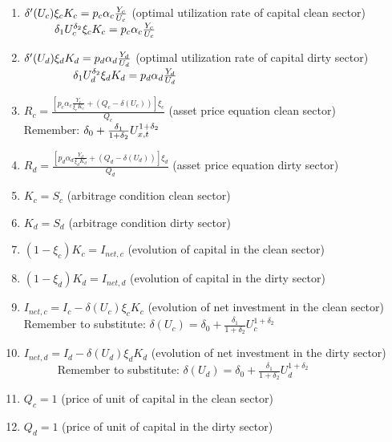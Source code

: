 \documentclass{article}
\begin{document}
\begin{enumerate}
\item $\delta ^{\prime }(U_{c})\xi _{c}K_{c}=p_{c}\alpha _{c}\frac{Y_{c}}{%
U_{c}}$ (optimal utilization rate of capital clean sector) $\ \ \ \ \ \ \ \
\delta _{1}U_{c}^{\delta _{2}}\xi _{c}K_{c}=p_{c}\alpha _{c}\frac{Y_{c}}{%
U_{c}}$

\item $\delta ^{\prime }(U_{d})\xi _{d}K_{d}=p_{d}\alpha _{d}\frac{Y_{d}}{%
U_{d}}$ (optimal utilization rate of capital dirty sector) \ \ \ \ \ \ \ \ $%
\ \delta _{1}U_{d}^{\delta _{2}}\xi _{d}K_{d}=p_{d}\alpha _{d}\frac{Y_{d}}{%
U_{d}}$

\item $R_{c}=\frac{\left[ p_{c}\alpha _{c}\frac{Y_{c}}{\xi _{c}K_{c}}+\left(
Q_{c}-\delta (U_{c})\right) \right] \xi _{c}}{Q_{c}}$ (asset price equation
clean sector) $\ \ \ \ \ \ \ \ \ \ \ \ \ \ $Remember: $\delta _{0}+\frac{%
\delta _{1}}{1+\delta _{2}}U_{x,t}^{1+\delta _{2}}$

\item $R_{d}=\frac{\left[ p_{d}\alpha _{d}\frac{Y_{d}}{\xi _{d}K_{d}}+\left(
Q_{d}-\delta (U_{d})\right) \right] \xi _{d}}{Q_{d}}$ (asset price equation
dirty sector)

\item $K_{c}=S_{c}$ (arbitrage condition clean sector)

\item $K_{d}=S_{d}$ (arbitrage condition dirty sector)

\item $(1-\xi _{c})K_{c}=I_{net,c}$ (evolution of capital in the clean
sector)

\item $(1-\xi _{d})K_{d}=I_{net,d}$ (evolution of capital in the dirty
sector)

\item $I_{net,c}=I_{c}-\delta (U_{c})\xi _{c}K_{c}$ (evolution of net
investment in the clean sector) $\ \ \ \ \ \ $Remember to substitute: $%
\delta (U_{c})=\delta _{0}+\frac{\delta _{1}}{1+\delta _{2}}U_{c}^{1+\delta
_{2}}$

\item $I_{net,d}=I_{d}-\delta (U_{d})\xi _{d}K_{d}$ (evolution of net
investment in the dirty sector) \ \ \ \ \ \ Remember to substitute: $\delta
(U_{d})=\delta _{0}+\frac{\delta _{1}}{1+\delta _{2}}U_{d}^{1+\delta _{2}}$

\item $Q_{c}=1$ (price of unit of capital in the clean sector)

\item $Q_{d}=1$ (price of unit of capital in the dirty sector)


\end{enumerate}
\end{document}
